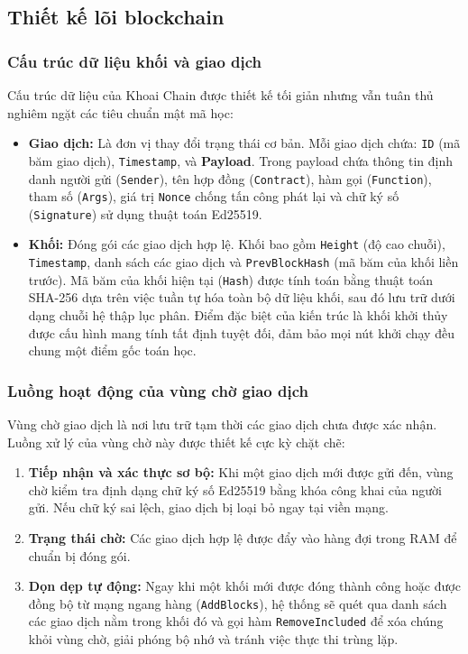 \documentclass[12pt,a4paper]{article}
\begin{document}
\subsection{Thiết kế lõi blockchain}
\subsubsection{Cấu trúc dữ liệu khối và giao dịch}
Cấu trúc dữ liệu của Khoai Chain được thiết kế tối giản nhưng vẫn tuân thủ nghiêm ngặt các tiêu chuẩn mật mã học:
\begin{itemize}
    \item \textbf{Giao dịch:} Là đơn vị thay đổi trạng thái cơ bản. Mỗi giao dịch chứa: \texttt{ID} (mã băm giao dịch), \texttt{Timestamp}, và \textbf{Payload}. Trong payload chứa thông tin định danh người gửi (\texttt{Sender}), tên hợp đồng (\texttt{Contract}), hàm gọi (\texttt{Function}), tham số (\texttt{Args}), giá trị \texttt{Nonce} chống tấn công phát lại và chữ ký số (\texttt{Signature}) sử dụng thuật toán Ed25519.
    \item \textbf{Khối:} Đóng gói các giao dịch hợp lệ. Khối bao gồm \texttt{Height} (độ cao chuỗi), \texttt{Timestamp}, danh sách các giao dịch và \texttt{PrevBlockHash} (mã băm của khối liền trước). Mã băm của khối hiện tại (\texttt{Hash}) được tính toán bằng thuật toán SHA-256 dựa trên việc tuần tự hóa toàn bộ dữ liệu khối, sau đó lưu trữ dưới dạng chuỗi hệ thập lục phân. Điểm đặc biệt của kiến trúc là khối khởi thủy được cấu hình mang tính tất định tuyệt đối, đảm bảo mọi nút khởi chạy đều chung một điểm gốc toán học.
\end{itemize}

\subsubsection{Luồng hoạt động của vùng chờ giao dịch}
Vùng chờ giao dịch là nơi lưu trữ tạm thời các giao dịch chưa được xác nhận. Luồng xử lý của vùng chờ này được thiết kế cực kỳ chặt chẽ:
\begin{enumerate}
    \item \textbf{Tiếp nhận và xác thực sơ bộ:} Khi một giao dịch mới được gửi đến, vùng chờ kiểm tra định dạng chữ ký số Ed25519 bằng khóa công khai của người gửi. Nếu chữ ký sai lệch, giao dịch bị loại bỏ ngay tại viền mạng.
    \item \textbf{Trạng thái chờ:} Các giao dịch hợp lệ được đẩy vào hàng đợi trong RAM để chuẩn bị đóng gói.
    \item \textbf{Dọn dẹp tự động:} Ngay khi một khối mới được đóng thành công hoặc được đồng bộ từ mạng ngang hàng (\texttt{AddBlocks}), hệ thống sẽ quét qua danh sách các giao dịch nằm trong khối đó và gọi hàm \texttt{RemoveIncluded} để xóa chúng khỏi vùng chờ, giải phóng bộ nhớ và tránh việc thực thi trùng lặp.
\end{enumerate}
\end{document}
